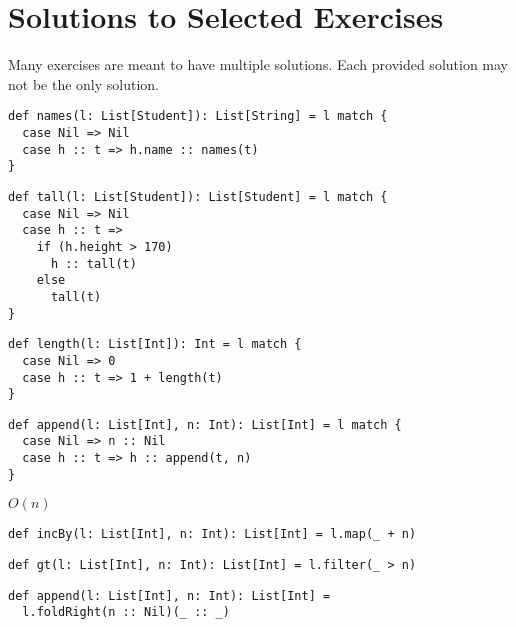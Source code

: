 \setchapterpreamble[u]{\margintoc}
\chapter{Solutions to Selected Exercises}

Many exercises are meant to have multiple solutions. Each provided solution may
not be the only solution.

\textbf{}
\vspace{-1em}
\begin{verbatim}
def names(l: List[Student]): List[String] = l match {
  case Nil => Nil
  case h :: t => h.name :: names(t)
}
\end{verbatim}

\textbf{}
\vspace{-1em}
\begin{verbatim}
def tall(l: List[Student]): List[Student] = l match {
  case Nil => Nil
  case h :: t =>
    if (h.height > 170)
      h :: tall(t)
    else
      tall(t)
}
\end{verbatim}

\textbf{}
\vspace{-1em}
\begin{verbatim}
def length(l: List[Int]): Int = l match {
  case Nil => 0
  case h :: t => 1 + length(t)
}
\end{verbatim}

\textbf{}
\vspace{-1em}
\begin{verbatim}
def append(l: List[Int], n: Int): List[Int] = l match {
  case Nil => n :: Nil
  case h :: t => h :: append(t, n)
}
\end{verbatim}
\vspace{-1em}
$O(n)$

\textbf{}
\vspace{-1em}
\begin{verbatim}
def incBy(l: List[Int], n: Int): List[Int] = l.map(_ + n)
\end{verbatim}

\textbf{}
\vspace{-1em}
\begin{verbatim}
def gt(l: List[Int], n: Int): List[Int] = l.filter(_ > n)
\end{verbatim}

\textbf{}
\vspace{-1em}
\begin{verbatim}
def append(l: List[Int], n: Int): List[Int] =
  l.foldRight(n :: Nil)(_ :: _)
\end{verbatim}

